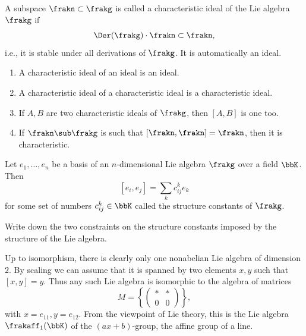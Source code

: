 \begin{defn}
    A subspace $\frakn\subset \frakg$ is called a characteristic ideal of the Lie algebra $\frakg$ if 
    \[\Der(\frakg)\cdot \frakn\subset \frakn,\]
    i.e., it is stable under all derivations of $\frakg$. It is automatically an ideal.
\end{defn}

\begin{xca}
\begin{enumerate}
    \item A characteristic ideal of an ideal is an ideal.
    \item A characteristic ideal of a characteristic ideal is a characteristic ideal.
    \item If $A,B$ are two characteristic ideals of $\frakg$, then $[A,B]$ is one too.
    \item If $\frakn\sub \frakg$ is such that $[\frakn,\frakn]=\frakn$, then it is characteristic.
\end{enumerate}
\end{xca}

\begin{defn}
    Let $e_1,\ldots,e_n$ be a basis of an $n$-dimensional Lie algebra $\frakg$ over a field $\bbK$. Then
    \[[e_i,e_j]=\sum_k c_{ij}^k e_k\]
    for some set of numbers $c_{ij}^k\in\bbK$ called the structure constants of $\frakg$.
\end{defn}

\begin{xca}\label{xca structure constants}
    Write down the two constraints on the structure constants imposed by the structure of the Lie algebra.
\end{xca}

\begin{example}
    Up to isomorphism, there is clearly only one nonabelian Lie algebra of dimension $2$. By scaling we can assume that it is spanned by two elements $x,y$ such that $[x,y]=y$. Thus any such Lie algebra is isomorphic to the algebra of matrices 
    \[M=\left\{\begin{pmatrix}
        \ast &\ast \\
        0&0
    \end{pmatrix}\right\},\]
    with $x=e_{11}, y=e_{12}$. From the viewpoint of Lie theory, this is the Lie algebra $\frakaff_1(\bbK)$ of the $(ax+b)$-group, the affine group of a line.
\end{example}

